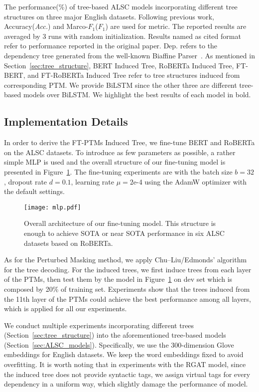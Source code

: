 \documentclass[11pt]{article}
\begin{document}
\begin{table*}[t]
  \caption{The  performance(\%)  of tree-based ALSC models incorporating different tree structures on three major English datasets.  Following previous work, Accuracy(\textit{Acc.}) and Marco-$F_1$(\textit{$F_1$}) are used for metric. The reported results are averaged by 3 runs with random initialization. Results named as cited format refer to performance reported in the original paper. Dep. refers to the dependency tree generated from the well-known Biaffine Parser~\citep{DBLP:conf/iclr/DozatM17}. As mentioned in Section~\ref{sec:tree_structure}, BERT Induced Tree, RoBERTa Induced Tree, FT-BERT, and FT-RoBERTa Induced Tree refer to tree structures induced from corresponding PTM. We provide BiLSTM since the other three are different tree-based models over BiLSTM. We highlight the best results of each model in bold.}
  \label{tb:eng}
\end{table*}
\subsection{Implementation Details}
In order to derive the FT-PTMs Induced Tree, we  fine-tune BERT and RoBERTa on the ALSC datasets.  To introduce as few parameters as possible, a rather simple MLP is used and the overall structure of our fine-tuning model is presented in Figure~\ref{fig:model_structure}. The fine-tuning experiments are with the batch size $b=32$, dropout rate $d=0.1$, learning rate $\mu=2$e-4 using the AdamW optimizer with the default settings.


\begin{figure}[]
  \texttt{[image: mlp.pdf]}
  \caption{Overall architecture of our fine-tuning model. This structure is enough to achieve SOTA or near SOTA performance in six ALSC datasets  based on RoBERTa.}\label{fig:model_structure}
\end{figure}
As for the Perturbed Masking method, we apply Chu–Liu/Edmonds' algorithm  for the tree decoding. For the induced trees, we first  induce trees from each layer of the PTMs, then test them by the  model in Figure~\ref{fig:model_structure} on dev set which is composed by 20\% of training set. Experiments show that the trees induced from the 11th layer of the PTMs could achieve the best performance among all layers, which is applied for  all  our experiments.

We conduct multiple experiments incorporating different trees (Section~\ref{sec:tree_structure}) into the aforementioned tree-based models (Section~\ref{sec:ALSC_models}). Specifically, we use the 300-dimension Glove~\citep{DBLP:conf/emnlp/PenningtonSM14} embeddings for English datasets.
We keep the word embeddings fixed to avoid overfitting. It is worth noting that in experiments with the RGAT model, since the induced tree does not provide syntactic tags, we assign virtual tags for every dependency in a uniform way, which slightly damage the performance of model.
\end{document}
